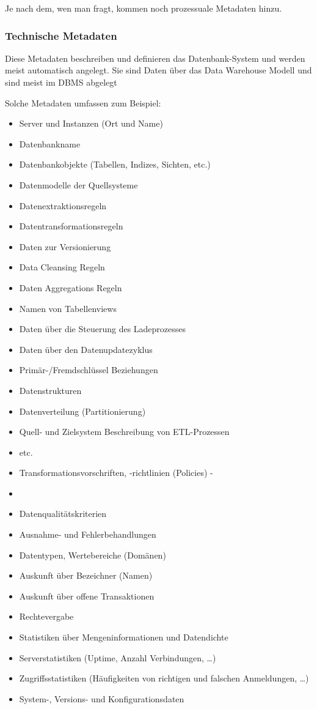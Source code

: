 \documentclass[a4paper, 11pt, nofootinbib]{article}
\begin{document}
Je nach dem, wen man fragt, kommen noch prozessuale Metadaten hinzu.

\subsubsection{Technische Metadaten}
Diese Metadaten beschreiben und definieren das Datenbank-System und werden meist automatisch angelegt. Sie sind Daten über das Data Warehouse Modell und sind meist im DBMS abgelegt

Solche Metadaten umfassen zum Beispiel:

\begin{multicols}{2}
	\begin{itemize}
		\item 	Server und Instanzen (Ort und Name)
		\item 	Datenbankname 
		\item 	Datenbankobjekte (Tabellen, Indizes, Sichten, etc.) 
		\item 	Datenmodelle der Quellsysteme 
		\item 	Datenextraktionsregeln 
		\item 	Datentransformationsregeln 
		\item 	Daten zur Versionierung 
		\item 	Data Cleansing Regeln 
		\item 	Daten Aggregations Regeln 
		\item 	Namen von Tabellenviews 
		\item 	Daten über die Steuerung des Ladeprozesses 
		\item 	Daten über den Datenupdatezyklus 
		\item 	Primär-/Fremdschlüssel Beziehungen 
		\item 	Datenstrukturen 
		\item 	Datenverteilung (Partitionierung) 
		\item 	Quell- und Zielsystem Beschreibung von ETL-Prozessen 
		\item 	etc.
		\item 	Transformationsvorschriften, -richtlinien (Policies) - \item 	\item 	Datenqualitätskriterien 
		\item 	Ausnahme- und Fehlerbehandlungen 
		\item 	Datentypen, Wertebereiche (Domänen) 
		\item 	Auskunft über Bezeichner (Namen) 
		\item 	Auskunft über offene Transaktionen 
		\item 	Rechtevergabe 
		\item 	Statistiken über Mengeninformationen und Datendichte 
		\item 	Serverstatistiken (Uptime, Anzahl Verbindungen, …) 
		\item 	Zugriffsstatistiken (Häufigkeiten von richtigen und falschen Anmeldungen, …) 
		\item 	System-, Versions- und Konfigurationsdaten 
	\end{itemize}
\end{multicols}
\end{document}

